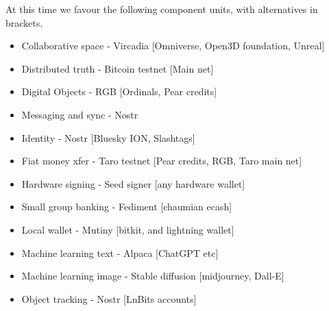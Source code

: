 At this time we favour the following component units, with alternatives in brackets.
\begin{itemize}
\item Collaborative space - Vircadia [Omniverse, Open3D foundation, Unreal]
\item Distributed truth - Bitcoin testnet [Main net]
\item Digital Objects - RGB [Ordinals, Pear credits]
\item Messaging and sync - Nostr 
\item Identity - Nostr [Bluesky ION, Slashtags]
\item Fiat money xfer - Taro testnet [Pear credits, RGB, Taro main net]
\item Hardware signing - Seed signer [any hardware wallet]
\item Small group banking - Fediment [chaumian ecash]
\item Local wallet - Mutiny [bitkit, and lightning wallet]
\item Machine learning text - Alpaca [ChatGPT etc]
\item Machine learning image - Stable diffusion [midjourney, Dall-E]
\item Object tracking - Nostr [LnBits accounts]
\end{itemize}

